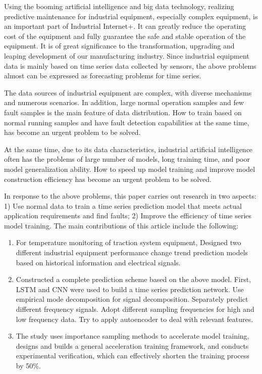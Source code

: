 \begin{abstract*}
  Using the booming artificial intelligence and big data technology,
  realizing predictive maintenance for industrial equipment, 
  especially complex equipment, is an important part of Industrial Internet+.
  It can greatly reduce the operating cost of the equipment 
  and fully guarantee the safe and stable operation of the equipment.
  It is of great significance to the transformation, 
  upgrading and leaping development of our manufacturing industry.
  Since industrial equipment data is mainly based on time series data 
  collected by sensors,
  the above problems almost can be expressed as forecasting problems for time series.
  
  The data sources of industrial equipment are complex, 
  with diverse mechanisms and numerous scenarios.
  In addition, large normal operation samples and few fault samples 
  is the main feature of data distribution.
  How to train based on normal running samples and 
  have fault detection capabilities at the same time,
  has become an urgent problem to be solved.
  
  At the same time, due to its data characteristics, 
  industrial artificial intelligence often has the problems of large number of models, 
  long training time, and poor model generalization ability. 
  How to speed up model training and improve model construction 
  efficiency has become an urgent problem to be solved.

  In response to the above problems, this paper carries out 
  research in two aspects: 
  1) Use normal data to train a time series prediction model 
  that meets actual application requirements and find faults; 
  2) Improve the efficiency of time series model training.
  The main contributions of this article include the following:

  \begin{enumerate}
    \item For temperature monitoring of traction system equipment,
    Designed two different industrial equipment performance change trend 
    prediction models based on historical information and electrical signals.
    \item Constructed a complete prediction scheme based on the above model. 
    First, LSTM and CNN were used to build a time series prediction network.
    Use empirical mode decomposition for signal decomposition.
    Separately predict different frequency signals.
    Adopt different sampling frequencies for high and low frequency data.
    Try to apply autoencoder to deal with relevant features.
    \item The study uses importance sampling methods to accelerate model training, 
    designs and builds a general acceleration training framework, 
    and conducts experimental verification, 
    which can effectively shorten the training process by 50\%.
  \end{enumerate}
\end{abstract*}

